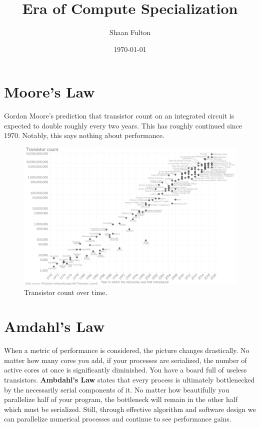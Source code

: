 \documentclass[12pt]{article}
\title{Era of Compute Specialization}
\author{Shaan Fulton}
\date{\today}
\begin{document}
\maketitle

\section*{Moore's Law}

Gordon Moore's prediction that transistor count on an integrated circuit is expected to double roughly every two years. This has roughly continued since 1970. Notably, this says nothing about performance.

\begin{figure}[h]
    \centering
    \includegraphics[width=1\textwidth]{moores.png}
    \caption{Transistor count over time.}
\end{figure}

\section*{Amdahl's Law}

When a metric of performance is considered, the picture changes drastically. No matter how many cores you add, if your processes are serialized, the number of active cores at once is significantly diminished. You have a board full of useless transistors. \textbf{Ambdahl's Law} states that every process is ultimately bottlenecked by the necessarily serial components of it. No matter how beautifully you parallelize half of your program, the bottleneck will remain in the other half which must be serialized. Still, through effective algorithm and software design we can parallelize numerical processes and continue to see performance gains.
\end{document}
